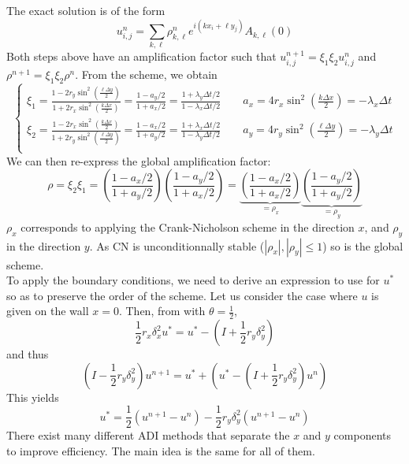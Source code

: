 \documentclass[12pt, openany]{report}
\theoremstyle{definition}
\begin{document}
The exact solution is of the form 
\begin{equation}
	u_{i,j}^n = \sum_{k,\ell} \rho_{k,\ell}^n e^{i(kx_i+\ell y_j)} A_{k,\ell}(0)
\end{equation} 
Both steps above have an amplification factor such that $u_{i,j}^{n+1} = \xi_1\xi_2 u_{i,j}^n$ and $\rho^{n+1} = \xi_1\xi_2\rho^n$. From the scheme, we obtain 
\begin{equation}
	\begin{cases}
		\xi_1 = \frac{1-2r_y\sin^2\left(\frac{\ell \Delta y}{2}\right)}{1+2r_x \sin^2\left(\frac{k\Delta x}{2}\right)} = \frac{1-a_y/2}{1+a_x/2} = \frac{1+\lambda_y\Delta t/2}{1-\lambda_x\Delta t/2} \qquad a_x = 4r_x \sin^2\left(\frac{k\Delta x}{2}\right) = -\lambda_x\Delta t \\
		\xi_2 = \frac{1-2r_x\sin^2\left(\frac{k \Delta x}{2}\right)}{1+2r_y \sin^2\left(\frac{\ell\Delta y}{2}\right)} = \frac{1-a_x/2}{1+a_y/2} = \frac{1+\lambda_x\Delta t/2}{1-\lambda_y\Delta t/2} \qquad a_y = 4r_y \sin^2\left(\frac{\ell\Delta y}{2}\right) = -\lambda_y\Delta t \\
	\end{cases}
\end{equation}
We can then re-express the global amplification factor:
\begin{equation}
	\rho = \xi_2\xi_1 = \left(\frac{1-a_x/2}{1+a_y/2}\right)\left(\frac{1-a_y/2}{1+a_x/2}\right) = \underbrace{\left(\frac{1-a_x/2}{1+a_x/2}\right)}_{=\rho_x} \underbrace{\left(\frac{1-a_y/2}{1+a_y/2}\right)}_{=\rho_y}
\end{equation}
$\rho_x$ corresponds to applying the Crank-Nicholson scheme in the direction $x$, and $\rho_y$ in the direction $y$. As CN is unconditionnally stable ($|\rho_x|, |\rho_y|\le 1$) so is the global scheme. \\
To apply the boundary conditions, we need to derive an expression to use for $u^*$ so as to preserve the order of the scheme. Let us consider the case where $u$ is given on the wall $x=0$. Then, from  with $\theta=\frac{1}{2}$, 
\begin{equation}
	\frac{1}{2}r_x\delta_x^2 u^* = u^* - \left(I+\frac{1}{2}r_y\delta_y^2\right)
\end{equation}
and thus 
\begin{equation}
	\left(I-\frac{1}{2}r_y\delta_y^2\right)u^{n+1} = u^*+ \left(u^* -\left(I+\frac{1}{2}r_y\delta_y^2\right)u^n\right) 
\end{equation}
This yields 
\begin{equation}
	u^* = \frac{1}{2}\left(u^{n+1}-u^n\right) - \frac{1}{2}r_y\delta_y^2\left(u^{n+1}-u^n\right)
\end{equation}
There exist many different ADI methods that separate the $x$ and $y$ components to improve efficiency. The main idea is the same for all of them. 
\end{document}
